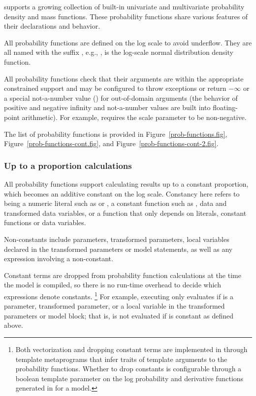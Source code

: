 \documentclass[article]{jss}
\begin{document}
 supports a growing collection of built-in univariate and
multivariate probability density and mass functions.  These
probability functions share various features of their declarations and
behavior.

All probability functions are defined on the log scale to avoid
underflow.  They are all named with the suffix , e.g.,
, is the log-scale normal distribution density
function.

All probability functions check that their arguments are within the
appropriate constrained support and may be configured to throw
exceptions or return $-\infty$ or a special not-a-number value
() for out-of-domain arguments (the behavior of positive and
negative infinity and not-a-number values are built into
floating-point arithmetic).  For example,
   requires the scale parameter
 to be non-negative.

The list of probability functions is provided in
Figure~\ref{prob-functions.fig}, 
Figure~\ref{prob-functions-cont.fig}, and
Figure~\ref{prob-functions-cont-2.fig}. 

\subsubsection{Up to a proportion calculations}

All probability functions support calculating results up to a constant
proportion, which becomes an additive constant on the log scale.
Constancy here refers to being a numeric literal such as  or
, a constant function such as , data and
transformed data variables, or a function that only depends on
literals, constant functions or data variables.

Non-constants include parameters, transformed parameters, local
variables declared in the transformed parameters or model statements,
as well as any expression involving a non-constant.

Constant terms are dropped from probability function calculations at
the time the model is compiled, so there is no run-time overhead to
decide which expressions denote constants.%
%
\footnote{Both vectorization and dropping constant terms are
  implemented in  through template metaprograms that
  infer traits of template arguments to the probability functions.
  Whether to drop constants is configurable through a boolean template
  parameter on the log probability and derivative functions generated
  in  for a model.}
%
For example, executing  only evaluates
 if  is a parameter, transformed
parameter, or a local variable in the transformed parameters or model
block; that is,  is not evaluated if  is
constant as defined above.  
\end{document}
